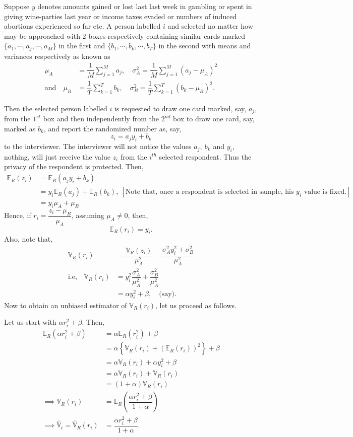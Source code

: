 \documentclass[12pt]{article}
\newcommand{\E}{\mathbb{E}}
\newcommand{\Var}{\mathbb{V}}
\theoremstyle{definition}
\begin{document}
Suppose $y$ denotes amounts gained or lost last last week in gambling or spent in giving wine-parties last year  or income taxes evaded or numbers of induced abortions  experienced so far etc. A person labelled $i$ and selected no matter how may be approached with $2$ boxes respectively containing similar cards marked $\{a_1, \cdots , a_j, \cdots, a_M\}$ in the first and $\{b_1,\cdots,b_k,\cdots,b_T\}$ in the second with means and variances respectively as known as 
\begin{align*}
    \mu_A & = \dfrac{1}{M}\sum_{j=1}^M a_j , \quad \sigma_A^2 = \dfrac{1}{M}\sum_{j=1}^M (a_j-\mu_A)^2 \\
    \text{and}\quad \mu_B & = \dfrac{1}{T}\sum_{k=1}^T b_k , \quad \sigma_B^2 = \dfrac{1}{T}\sum_{k=1}^T (b_k -\mu_B)^2.
\end{align*}

Then the selected person labelled $i$ is requested to draw one card marked, say, $a_j$, from the $1^{st}$ box and then independently from the $2^{nd}$ box to draw one card, say, marked as $b_k$, and report the randomized number as, say, $$z_i = a_jy_i + b_k$$ to the interviewer. The interviewer will not notice the values $a_j,\ b_k $ and $y_i$, nothing, will just receive the value $z_i$ from the $i^{th}$ selected respondent. Thus the privacy of the respondent is protected. Then,
\begin{align*}
  \E_R(z_i)  & = \E_R(a_jy_i + b_k)  \\
  & = y_i \E_R(a_j) +\E_R(b_k), \ [\text{Note that, once a respondent is selected in sample, his $y_i$ value is fixed.}]\\
  & = y_i\mu_A + \mu_B
\end{align*}
Hence, if $r_i = \dfrac{z_i-\mu_B}{\mu_A}$, assuming $\mu_A\neq 0$, then,
$$\E_R(r_i)=y_i .$$
Also, note that,
\begin{align*}
    \Var_R(r_i) & = \dfrac{\Var_R(z_i)}{\mu_A^2}=\dfrac{\sigma_A^2y_i^2 + \sigma_B^2}{\mu_A^2}\\
    \text{i.e,}\quad \Var_R(r_i) & = y_i^2\dfrac{\sigma_A^2}{\mu_A^2} + \dfrac{\sigma_B^2}{\mu_A^2}\\
    & = \alpha y_i^2 + \beta , \quad \text{(say)}.
\end{align*}
Now to obtain an unbiased estimator of $\Var_R(r_i)$, let us proceed as follows.

Let us start with $\alpha r_i^2 +\beta $. Then,
\begin{align*}
    \E_R(\alpha r_i^2 +\beta) & = \alpha \E_R(r_i^2)+\beta \\
    & = \alpha\left\{\Var_R(r_i) + (\E_R(r_i))^2\right\}+\beta \\
    & = \alpha \Var_R(r_i) +\alpha y_i^2 +\beta \\
    & = \alpha \Var_R(r_i) + \Var_R(r_i) \\
    & = (1+\alpha)\Var_R(r_i)\\
    \implies \Var_R(r_i) & = \E_R\left(\dfrac{\alpha r_i^2 +\beta}{1+\alpha}\right)\\
    \implies \hat{\Var}_i = \hat{\Var}_R(r_i) & = \dfrac{\alpha r_i^2 +\beta}{1+\alpha} .
\end{align*}
\end{document}
